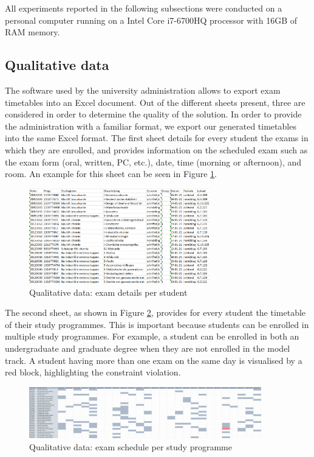 All experiments reported in the following subsections were conducted on a personal computer running on a Intel Core i7-6700HQ processor with 16GB of RAM memory.

\subsection{Qualitative data} \label{qualitative}

The software used by the university administration allows to export exam timetables into an Excel document. Out of the different sheets present, three are considered in order to determine the quality of the solution. In order to provide the administration with a familiar format, we export our generated timetables into the same Excel format. The first sheet details for every student the exams in which they are enrolled, and provides information on the scheduled exam such as the exam form (oral, written, PC, etc.), date, time (morning or afternoon), and room. An example for this sheet can be seen in Figure \ref{fig:sheet1}. 

\begin{figure}[H]
	\centering
	\includegraphics[width=0.7\textwidth]{images/excel/excel_sheet1.png} 
	\caption{Qualitative data: exam details per student}
	\label{fig:sheet1}
\end{figure}

The second sheet, as shown in Figure \ref{fig:sheet2}, provides for every student the timetable of their study programmes. This is important because students can be enrolled in multiple study programmes. For example, a student can be enrolled in both an undergraduate and graduate degree when they are not enrolled in the model track. A student having more than one exam on the same day is visualised by a red block, highlighting the constraint violation.

\begin{figure}[H]
	\centering
	\includegraphics[width=0.9\textwidth]{images/excel/excel_sheet2.png} 
	\caption{Qualitative data: exam schedule per study programme}
	\label{fig:sheet2}
\end{figure}

